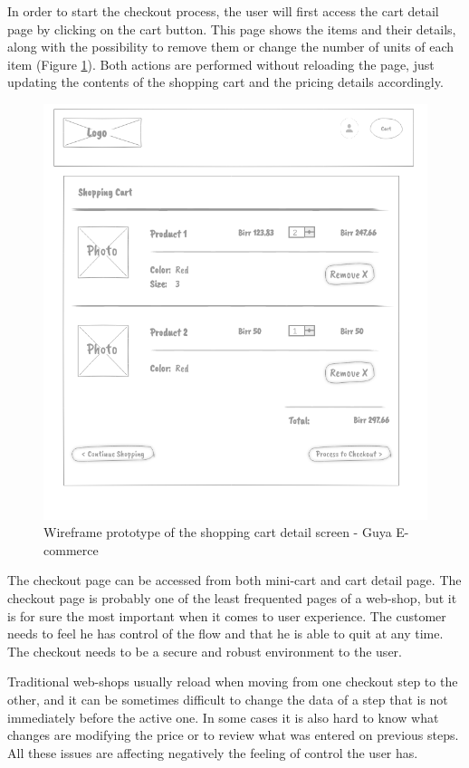 In order to start the checkout process, the user will first access the cart detail page by clicking on the cart button. This page shows the items and their details, along with the possibility to remove them or change the number of units of each item (Figure \ref{shopping-cart}). Both actions are performed without reloading the page, just updating the contents of the shopping cart and the pricing details accordingly.

\begin{figure}[!h]
\center
\includegraphics[keepaspectratio, width=15cm]{wireframes/shoppingcart.png}
\caption{Wireframe prototype of the shopping cart detail screen - Guya E-commerce}
\label{shopping-cart}
\end{figure}
\clearpage

The checkout page can be accessed from both mini-cart and cart detail page. The checkout page is probably one of the least frequented pages of a web-shop, but it is for sure the most important when it comes to user experience. The customer needs to feel he has control of the flow and that he is able to quit at any time. The checkout needs to be a secure and robust environment to the user.

Traditional web-shops usually reload when moving from one checkout step to the other, and it can be sometimes difficult to change the data of a step that is not immediately before the active one. In some cases it is also hard to know what changes are modifying the price or to review what was entered on previous steps. All these issues are affecting negatively the feeling of control the user has.

